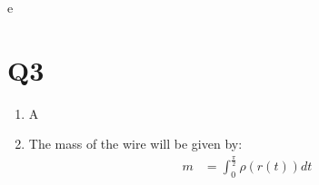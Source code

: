 \documentclass[a4paper, 11pt]{article}
\begin{document}
\begin{enumerate}[label=(\alph*)]
        e




\end{enumerate}



\section*{Q3}
\begin{enumerate}[label=(\alph*)]
  \item A
  \item The mass of the wire will be given by:
        \begin{align*}
          m & = \int_0^{\frac{\pi}2}\rho(r(t))dt
        \end{align*}
\end{enumerate}

\end{document}
